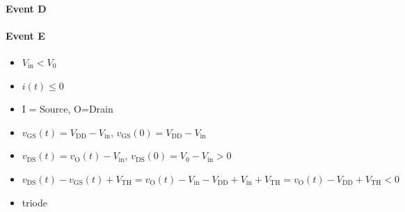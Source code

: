 \documentclass{article}[11pt]
\begin{document}
\paragraph{Event D}

\paragraph{Event E}

\begin{itemize}
\item $V_{\mathrm{in}} < V_0$
\item $i(t)\leq0$ 
\item I = Source, O=Drain
\item $v_{\mathrm{GS}}(t) = V_{\mathrm{DD}}-V_{\mathrm{in}}$, $v_{\mathrm{GS}}(0) = V_{\mathrm{DD}}-V_{\mathrm{in}}$
\item $v_{\mathrm{DS}}(t) = v_{\mathrm{O}}(t)-V_{\mathrm{in}}$, $v_{\mathrm{DS}}(0) = V_0-V_{\mathrm{in}} > 0$
\item $v_{\mathrm{DS}}(t)- v_{\mathrm{GS}}(t) + V_{\mathrm{TH}}  = v_{\mathrm{O}}(t)-V_{\mathrm{in}}-V_{\mathrm{DD}}+V_{\mathrm{in}}+V_{\mathrm{TH}} = v_{\mathrm{O}}(t) - V_{\mathrm{DD}} +V_{\mathrm{TH}}<0$
\item triode
\end{itemize}

\end{document}
